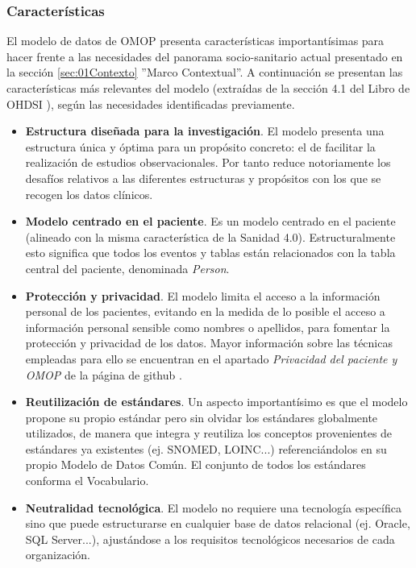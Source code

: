 \subsubsection{Características}

El modelo de datos de OMOP presenta características importantísimas para hacer frente a las necesidades del panorama socio-sanitario actual presentado en la sección \ref{sec:01Contexto} ''Marco Contextual''. A continuación se presentan las características más relevantes del modelo (extraídas de la sección  4.1 del Libro de OHDSI \cite{OHDSIbook}), según las necesidades identificadas previamente.

\begin{itemize}
    \item \textbf{Estructura diseñada para la investigación}. 
    El modelo presenta una estructura única y óptima para un propósito concreto: el de facilitar la realización de estudios observacionales. Por tanto reduce notoriamente los desafíos relativos a las diferentes estructuras y propósitos con los que se recogen los datos clínicos.
    \item \textbf{Modelo centrado en el paciente}. Es un modelo centrado en el paciente (alineado con la misma característica de la Sanidad 4.0). Estructuralmente esto significa que todos los eventos y tablas están relacionados con la tabla central del paciente, denominada \textit{Person}. 
    \item \textbf{Protección y privacidad}. El modelo limita el acceso a la información personal de los pacientes, evitando en la medida de lo posible el acceso a información personal sensible como nombres o apellidos, para fomentar la protección y privacidad de los datos. Mayor información sobre las técnicas empleadas para ello se encuentran en el apartado \textit{Privacidad del paciente y OMOP} de la página de github \cite{gitPagesCMD}.
    \item \textbf{Reutilización de estándares}. Un aspecto importantísimo es que el modelo propone su propio estándar pero sin olvidar los estándares globalmente utilizados, de manera que integra y reutiliza los conceptos provenientes de estándares ya existentes (ej. SNOMED, LOINC...) referenciándolos en su propio Modelo de Datos Común. El conjunto de todos los estándares conforma el Vocabulario.
    \item \textbf{Neutralidad tecnológica}. El modelo no requiere una tecnología específica sino que puede estructurarse en cualquier base de datos relacional (ej. Oracle, SQL Server...), ajustándose a los requisitos tecnológicos necesarios de cada organización.
    
\end{itemize}

